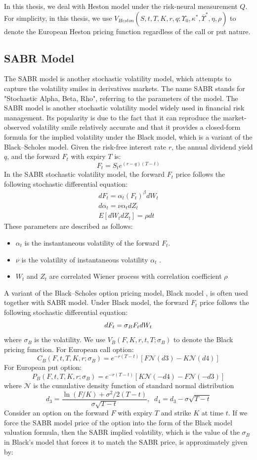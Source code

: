 \documentclass[letterpaper,12pt,titlepage,oneside,final]{book}
\numberwithin{equation}{section}
\theoremstyle{definition}
\begin{document}
In this thesis, we deal with Heston model under the risk-neural measurement $Q$. For simplicity, in this thesis,  we use $V_{Heston}(S,t,T,K,r,q;\Upsilon_0,\kappa^*,\overline{\Upsilon}^*,\eta,\rho)$ to denote the European Heston pricing function regardless of the call or put nature.
\subsection{SABR Model}
\label{sec:SABR}
The SABR model  \cite{hagan2002managing} is another stochastic volatility model, which attempts to capture the volatility smiles in derivatives markets. The name SABR stands for "Stochastic Alpha, Beta, Rho", referring to the parameters of the model.  The SABR model is another stochastic volatility model widely used in financial risk management. Its popularity is due to the fact that it can reproduce the market-observed volatility smile relatively accurate and that it provides a closed-form
formula for the implied volatility under the Black model, which is a variant of the Black–Scholes model. 
Given the risk-free interest rate $r$, the annual dividend yield $q$, and the forward $F_t$ with expiry $T$ is: 
\[
F_t=S_t e^{(r-q) (T-t)}
\]
In the SABR stochastic volatility model, the  forward $F_t$ price follows the following stochastic differential equation:
\[
\begin{split}
dF_t=\alpha_t (F_t)^{\beta}dW_t\\
d\alpha_t=\mathbb{\nu} \alpha_t dZ_t\\
E[dW_tdZ_t]=\rho dt
\end{split}
\]
These parameters are described as follows:
\begin{itemize}
	\item $\alpha_t$ is the instantaneous  volatility of the forward $F_t$.
	\item $\nu$ is the   volatility of  instantaneous  volatility $\alpha_t$  .
	\item $W_t$ and $Z_t$ are correlated Wiener process with correlation coefficient $\rho$
\end{itemize}

A variant of the Black–Scholes option pricing model, Black model \cite{black1976pricing}, is often used together with SABR model. Under Black model, the  forward $F_t$ price follows the following stochastic differential equation:
\[
dF_t=\sigma_B F_t dW_t\\
\]
where $\sigma_B$ is the volatility. We use $V_B(F,K,r,t,T;\sigma_{B})$ to denote the Black pricing function. For European call option:
\[
C_B(F,t,T,K,r;\sigma_{B})=e^{-r(T-t)}[F \mathcal{N} (d3)-K  \mathcal{N} (d4)]
\]
For European put option:
\[
P_B(F,t,T,K,r;\sigma_{B})=e^{-r(T-t)}[K  \mathcal{N} (-d4)-F  \mathcal{N} (-d3)]
\]
where $\mathcal{N}$ is the cumulative density function of standard normal distribution
\[
d_3=\frac{\ln(F/K)+\sigma^2/2(T-t)}{\sigma \sqrt{T-t}}, \;\; d_4=d_3-\sigma  \sqrt{T-t}
\]
Consider an option on the forward $F$ with expiry $T$ and strike $K$ at time $t$.
If we force the SABR model price of the option into the form of the Black model valuation formula, then the SABR implied volatility, which is the value of the $\sigma_B$ in Black's model that forces it to match the SABR price, is approximately given by:
\end{document}

